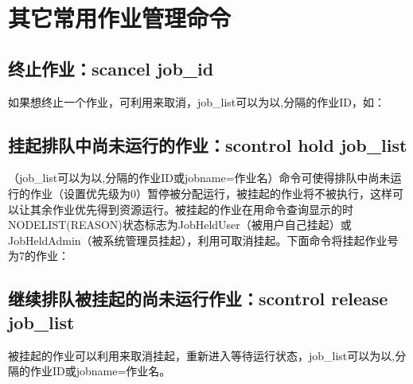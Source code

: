 \section{其它常用作业管理命令}
\subsection{终止作业：scancel job\_id}
如果想终止一个作业，可利用来取消，job\_list可以为以,分隔的作业ID，如：


\subsection{挂起排队中尚未运行的作业：scontrol hold job\_list}
（job\_list可以为以,分隔的作业ID或jobname=作业名）命令可使得排队中尚未运行的作业（设置优先级为0）暂停被分配运行，被挂起的作业将不被执行，这样可以让其余作业优先得到资源运行。被挂起的作业在用命令查询显示的时NODELIST(REASON)状态标志为JobHeldUser（被用户自己挂起）或JobHeldAdmin（被系统管理员挂起），利用可取消挂起。下面命令将挂起作业号为7的作业：


\subsection{继续排队被挂起的尚未运行作业：scontrol release job\_list}
被挂起的作业可以利用来取消挂起，重新进入等待运行状态，job\_list可以为以,分隔的作业ID或jobname=作业名。


%
%
%

